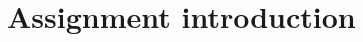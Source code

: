 \documentclass[a4paper,11pt]{article}
\begin{document}
\section{Assignment introduction}
\end{document}
